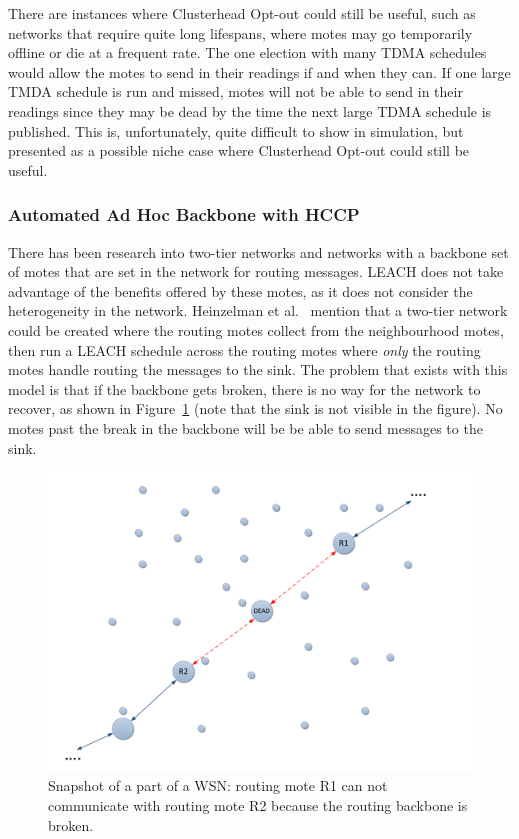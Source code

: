 There are instances where  Clusterhead Opt-out could still be useful, such as
networks that require quite long lifespans, where motes may go temporarily offline
or die at a frequent rate. The one election with many TDMA schedules would
allow the motes to send in their readings if and when they can. If one large
TMDA schedule is run and missed, motes will not be able to send in their readings
since they may be dead by the time the next large TDMA schedule is published.
This is, unfortunately, quite difficult to show in simulation, but presented 
as a possible niche case where Clusterhead Opt-out could still be useful.


\subsubsection{Automated Ad Hoc Backbone with HCCP}
There has been research into two-tier networks and networks with a backbone set of motes that are
set in the network for routing messages. LEACH does not take advantage of 
the benefits offered by these motes, as it does not consider the heterogeneity in the network. Heinzelman et al.~\cite{leach}
mention that a two-tier network could be created where the routing motes collect from the neighbourhood motes,
then run a LEACH schedule across the routing motes where \emph{only} the 
routing motes handle routing the messages to the sink.
The problem that exists with this model is that if the backbone gets broken,
there is no way for the network to recover, as shown in Figure~\ref{fig:images_BrokenBackbone_Backbone} (note that the sink is 
not visible in the figure). 
No motes past the break in the backbone will be
be able to send messages to the sink.

\begin{figure}[tbp]
    \centering
        \includegraphics[width=6.5in]{images/BrokenBackbone/Backbone.pdf}
    \caption{Snapshot of a part of a WSN: routing mote R1 can not communicate with routing mote R2 because the routing backbone is broken.}
    \label{fig:images_BrokenBackbone_Backbone}
\end{figure}


